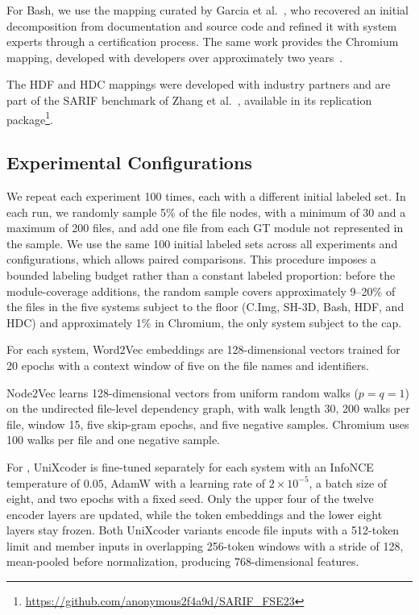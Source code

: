 For Bash, we use the mapping curated by Garcia et al.~\cite{garcia2013}, who recovered an initial decomposition from documentation and source code and refined it with system experts through a certification process. The same work provides the Chromium mapping, developed with developers over approximately two years~\cite{deps_impact}.
 
The HDF and HDC mappings were developed with industry partners and are part of the SARIF benchmark of Zhang et al.~\cite{sarif}, available in its replication package\footnote{\label{fnsarif}\href{https://github.com/anonymous2f4a9d/SARIF_FSE23/tree/main}{https://github.com/anonymous2f4a9d/SARIF\_FSE23}}.
\subsection{Experimental Configurations}
We repeat each experiment 100 times, each with a different initial labeled set. In each run, we randomly sample 5\% of the file nodes, with a minimum of 30 and a maximum of 200 files, and add one file from each GT module not represented in the sample. We use the same 100 initial labeled sets across all experiments and configurations, which allows paired comparisons. This procedure imposes a bounded labeling budget rather than a constant labeled proportion: before the module-coverage additions, the random sample covers approximately 9--20\% of the files in the five systems subject to the floor (C.Img, SH-3D, Bash, HDF, and HDC) and approximately 1\% in Chromium, the only system subject to the cap.

For each system, Word2Vec embeddings are 128-dimensional vectors trained for 20 epochs with a context window of five on the file names and identifiers.

Node2Vec learns 128-dimensional vectors from uniform random walks ($p=q=1$) on the undirected file-level dependency graph, with walk length 30, 200 walks per file, window 15, five skip-gram epochs, and five negative samples. Chromium uses 100 walks per file and one negative sample.
 
For \ft{}, UniXcoder is fine-tuned separately for each system with an InfoNCE temperature of $0.05$, AdamW with a learning rate of $2\times10^{-5}$, a batch size of eight, and two epochs with a fixed seed. Only the upper four of the twelve encoder layers are updated, while the token embeddings and the lower eight layers stay frozen. Both UniXcoder variants encode file inputs with a 512-token limit and member inputs in overlapping 256-token windows with a stride of 128, mean-pooled before normalization, producing 768-dimensional features.
 

